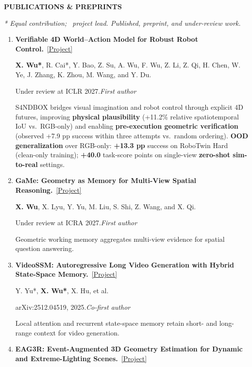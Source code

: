 \documentclass[a4paper]{article}
\newcommand{\cvsection}[1]{%
  \par\vspace{2.0pt}%
  {\color{cvblue}\fontsize{11}{12.2}\selectfont\bfseries\MakeUppercase{#1}}\par
  \vspace{-4pt}{\color{cvblue}\rule{\textwidth}{0.4pt}}\par\vspace{1.0pt}%
}
\newcommand{\pubgroup}[1]{%
  \par\vspace{2.0pt}{\color{cvblue}\fontsize{9.4}{10.4}\selectfont\bfseries #1}\par
}
\newcommand{\pubnote}[1]{\par{\color{cvgray}#1}}
\begin{document}
\cvsection{Publications \& Preprints}
{\fontsize{9}{9.65}\selectfont
\textit{* Equal contribution; \textdagger\ project lead. Published, preprint, and under-review work.}\par
\pubgroup{First- and Co-first-author Work}
\begin{enumerate}[leftmargin=1.6em,labelsep=0.38em,itemsep=0.4pt,topsep=1.3pt,parsep=0pt,partopsep=0pt]
\item \textbf{Verifiable 4D World--Action Model for Robust Robot Control.}~\href{https://candy-crusher.github.io/xiaoshanwu.github.io/projects/sandbox/}{\textcolor{cvblue}{[Project]}}\par
\textbf{X. Wu*}, R. Cai*, Y. Bao, Z. Su, A. Wu, F. Wu, Z. Li, Z. Qi, H. Chen, W. Ye, J. Zhang, K. Zhou, M. Wang, and Y. Du.\par
Under review at ICLR 2027.\hfill\textcolor{cvblue}{\textit{First author}}
\pubnote{S4NDBOX bridges visual imagination and robot control through explicit 4D futures, improving \textbf{physical plausibility} (+11.2\% relative spatiotemporal IoU vs.\ RGB-only) and enabling \textbf{pre-execution geometric verification} (observed +7.9 pp success within three attempts vs.\ random ordering).} \textbf{OOD generalization} over RGB-only: \textbf{+13.3 pp} success on RoboTwin Hard (clean-only training); \textbf{+40.0} task-score points on single-view \textbf{zero-shot sim-to-real} settings.
\item \textbf{GaMe: Geometry as Memory for Multi-View Spatial Reasoning.}~\href{https://candy-crusher.github.io/xiaoshanwu.github.io/projects/game/}{\textcolor{cvblue}{[Project]}}\par
\textbf{X. Wu}, X. Lyu, Y. Yu, M. Liu, S. Shi, Z. Wang, and X. Qi.\par
Under review at ICRA 2027.\hfill\textcolor{cvblue}{\textit{First author}}
\pubnote{Geometric working memory aggregates multi-view evidence for spatial question answering.}
\item \textbf{VideoSSM: Autoregressive Long Video Generation with Hybrid State-Space Memory.}~\href{https://candy-crusher.github.io/xiaoshanwu.github.io/projects/videossm/}{\textcolor{cvblue}{[Project]}}\par
Y. Yu*, \textbf{X. Wu*}, X. Hu, et al.\par
arXiv:2512.04519, 2025.\hfill\textcolor{cvblue}{\textit{Co-first author}}
\pubnote{Local attention and recurrent state-space memory retain short- and long-range context for video generation.}
\item \textbf{EAG3R: Event-Augmented 3D Geometry Estimation for Dynamic and Extreme-Lighting Scenes.}~\href{https://candy-crusher.github.io/xiaoshanwu.github.io/projects/eag3r/}{\textcolor{cvblue}{[Project]}}\par

\end{enumerate}}
\end{document}
